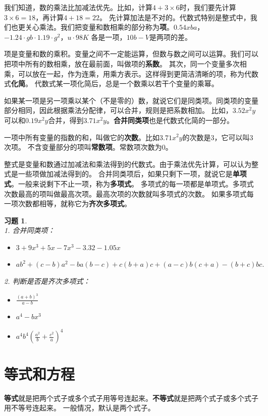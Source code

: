 \documentclass[12pt,UTF8]{ctexbook}
\newtheorem{xt}{习题}[section]
\begin{document}
我们知道，数的乘法比加减法优先。比如，计算$4 + 3\times 6$时，我们要先计算$3\times 6 = 18$，再计算$4 + 18 = 22$。
先计算加法是不对的。代数式特别是整式中，我们也更关心乘法。我们把变量和数相乘的部分称为\textbf{项}。$0.54xba$，$-1.24\cdot gb\cdot 1.19 \cdot g^2$，$u\cdot 98K$
各是一项，$10b - V$是两项的差。

项是变量和数的乘积。变量之间不一定能运算，但数与数之间可以运算。我们可以把项中所有的数相乘，放在最前面，叫做项的\textbf{系数}。
其次，同一个变量多次相乘，可以放在一起，作为连乘，用乘方表示。这样得到更简洁清晰的项，称为代数式\textbf{化简}。
代数式某一项化简后，总是一个数乘以若干个变量的乘幂。

如果某一项是另一项乘以某个（不是零的）数，就说它们是同类项。同类项的变量部分相同，因此根据乘法分配律，可以合并，规则是把系数相加。
比如，$3.52x^2y$可以和$0.19x^2y$合并，得到$3.71x^2y$。\textbf{合并同类项}也是代数式化简的一部分。

一项中所有变量的指数的和，叫做它的\textbf{次数}。比如$3.71x^2y$的次数是$3$，它可以叫$3$次项。
不含变量部分的项叫\textbf{常数项}。常数项次数为$0$。

整式是变量和数通过加减法和乘法得到的代数式。由于乘法优先计算，可以认为整式是一些项做加减法得到的。
合并同类项后，如果只剩下一项，就说它是\textbf{单项式}。一般来说剩下不止一项，称为\textbf{多项式}。
多项式的每一项都是单项式。多项式次数最高的项叫做最高次项。最高次项的次数就叫多项式的次数。
如果多项式每一项次数都相等，就称它为\textbf{齐次多项式}。
\begin{xt}\label{xt:1-0-0}
    \mbox{} \\
    1. 合并同类项：\begin{itemize}
        \item $3 + 9x^3 + 5x - 7x^3 - 3.32 - 1.05x$
        \item $ab^2 + (c-b)a^2 - ba(b - c) + c(b + a)c + (a - c)b(c + a) - (b + c)bc.$
    \end{itemize}
    2. 判断是否是齐次多项式：\begin{itemize}
        \item $\frac{(a+b)^3}{a - b}$
        \item $a^4 - bx^3$
        \item $a^4b^4\left(\frac{a^2}{b} + \frac{c^2}{a}\right)^4$
    \end{itemize}
\end{xt}

\section{等式和方程}
\textbf{等式}就是把两个式子或多个式子用等号连起来。\textbf{不等式}就是把两个式子或多个式子用不等号连起来。
一般情况，默认是两个式子。
\end{document}
